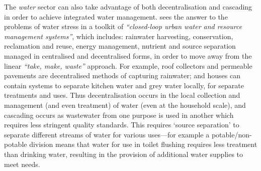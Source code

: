 The \emph{water} sector can also take advantage of both decentralisation and cascading in order to achieve integrated water management. \citet[p. 809]{Daigger2009} sees the answer to the problems of water stress in a toolkit of \emph{``closed-loop urban water and resource management systems''}, which includes: rainwater harvesting, conservation, reclamation and reuse, energy management, nutrient and source separation managed in centralised and decentralised forms, in order to move away from the linear \emph{``take, make, waste''} approach. For example, roof collectors and permeable pavements are decentralised methods of capturing rainwater; and houses can contain systems to separate kitchen water and grey water locally, for separate treatments and uses. Thus decentralisation occurs in the local collection and management (and even treatment) of water (even at the household scale), and cascading occurs as wastewater from one purpose is used in another which requires less stringent quality standards. This requires `source separation' to separate different streams of water for various uses---for example a potable/non-potable division means that water for use in toilet flushing requires less treatment than drinking water, resulting in the provision of additional water supplies to meet needs.

